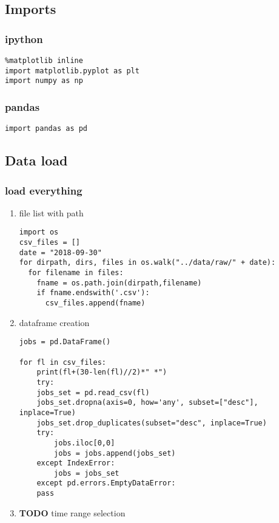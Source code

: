 \documentclass[11pt]{article}
\begin{document}
\subsection{Imports}
\label{sec:orgc9a0115}
\subsubsection{ipython}
\label{sec:orgfca6a0f}
\begin{verbatim}
%matplotlib inline
import matplotlib.pyplot as plt
import numpy as np
\end{verbatim}
\subsubsection{pandas}
\label{sec:orgf8d91d1}
\begin{verbatim}
import pandas as pd    
\end{verbatim}

\subsection{Data load}
\label{sec:org18efb36}
\subsubsection{load everything}
\label{sec:orgacbe5d9}
\begin{enumerate}
\item file list with path
\label{sec:org2f745f4}
\begin{verbatim}
import os
csv_files = []
date = "2018-09-30"
for dirpath, dirs, files in os.walk("../data/raw/" + date): 
  for filename in files:
    fname = os.path.join(dirpath,filename)
    if fname.endswith('.csv'):
      csv_files.append(fname)
\end{verbatim}
\item dataframe creation
\label{sec:orgf6914d4}
\begin{verbatim}
jobs = pd.DataFrame()

for fl in csv_files:
    print(fl+(30-len(fl)//2)*" *")
    try:
	jobs_set = pd.read_csv(fl)
	jobs_set.dropna(axis=0, how='any', subset=["desc"], inplace=True)
	jobs_set.drop_duplicates(subset="desc", inplace=True)            
	try:                                                             
	    jobs.iloc[0,0]                                               
	    jobs = jobs.append(jobs_set)                                 
	except IndexError:                                               
	    jobs = jobs_set                                              
    except pd.errors.EmptyDataError:
	pass
\end{verbatim}

\item {\bfseries\sffamily TODO} time range selection
\label{sec:org6dec77c}
\end{enumerate}
\end{document}
